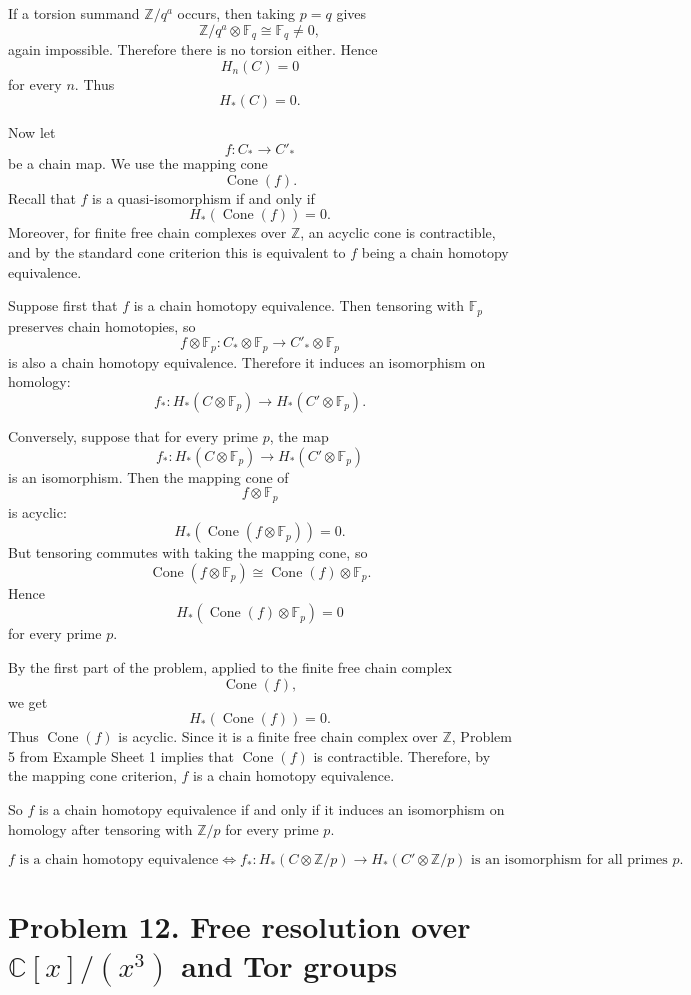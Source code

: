 \documentclass[12pt,a4paper]{article}
\theoremstyle{notespace}
\begin{document}
If a torsion summand \(\mathbb Z/q^a\) occurs, then taking \(p=q\) gives
\[
\mathbb Z/q^a\otimes \mathbb F_q \cong \mathbb F_q\neq 0,
\]
again impossible. Therefore there is no torsion either. Hence
\[
H_n(C)=0
\]
for every \(n\). Thus
\[
H_*(C)=0.
\]

Now let
\[
f:C_*\longrightarrow C'_*
\]
be a chain map. We use the mapping cone
\[
\operatorname{Cone}(f).
\]
Recall that \(f\) is a quasi-isomorphism if and only if
\[
H_*(\operatorname{Cone}(f))=0.
\]
Moreover, for finite free chain complexes over \(\mathbb Z\), an acyclic cone is contractible, and by the standard cone criterion this is equivalent to \(f\) being a chain homotopy equivalence.

Suppose first that \(f\) is a chain homotopy equivalence. Then tensoring with \(\mathbb F_p\) preserves chain homotopies, so
\[
f\otimes \mathbb F_p:C_*\otimes \mathbb F_p
\longrightarrow
C'_*\otimes \mathbb F_p
\]
is also a chain homotopy equivalence. Therefore it induces an isomorphism on homology:
\[
f_*:H_*(C\otimes \mathbb F_p)
\longrightarrow
H_*(C'\otimes \mathbb F_p).
\]

Conversely, suppose that for every prime \(p\), the map
\[
f_*:H_*(C\otimes \mathbb F_p)
\longrightarrow
H_*(C'\otimes \mathbb F_p)
\]
is an isomorphism. Then the mapping cone of
\[
f\otimes \mathbb F_p
\]
is acyclic:
\[
H_*(\operatorname{Cone}(f\otimes \mathbb F_p))=0.
\]
But tensoring commutes with taking the mapping cone, so
\[
\operatorname{Cone}(f\otimes \mathbb F_p)
\cong
\operatorname{Cone}(f)\otimes \mathbb F_p.
\]
Hence
\[
H_*(\operatorname{Cone}(f)\otimes \mathbb F_p)=0
\]
for every prime \(p\).

By the first part of the problem, applied to the finite free chain complex
\[
\operatorname{Cone}(f),
\]
we get
\[
H_*(\operatorname{Cone}(f))=0.
\]
Thus \(\operatorname{Cone}(f)\) is acyclic. Since it is a finite free chain complex over \(\mathbb Z\), Problem 5 from Example Sheet 1 implies that \(\operatorname{Cone}(f)\) is contractible. Therefore, by the mapping cone criterion, \(f\) is a chain homotopy equivalence.

So \(f\) is a chain homotopy equivalence if and only if it induces an isomorphism on homology after tensoring with \(\mathbb Z/p\) for every prime \(p\).

\[
\boxed{
	f \text{ is a chain homotopy equivalence}
	\iff
	f_*:H_*(C\otimes \mathbb Z/p)\to H_*(C'\otimes \mathbb Z/p)
	\text{ is an isomorphism for all primes }p.
}
\]


\section{Problem 12. Free resolution over \(\mathbb C[x]/(x^3)\) and Tor groups}
\end{document}
